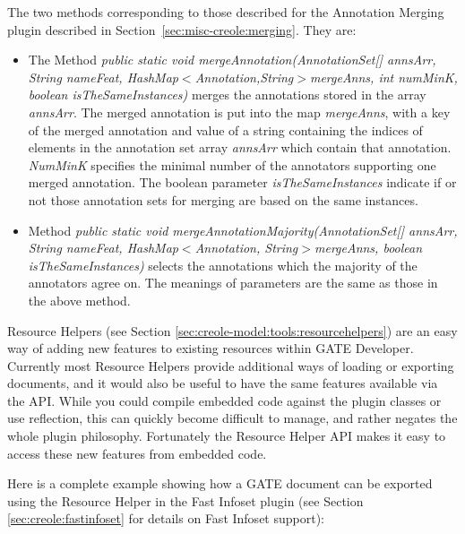 The two methods corresponding to those described for the Annotation Merging
plugin described in Section~\ref{sec:misc-creole:merging}. They are:

\begin{itemize}

\item The Method {\em public static void mergeAnnotation(AnnotationSet[]
    annsArr, String nameFeat, HashMap$<$Annotation,String$>$mergeAnns, int
    numMinK, boolean isTheSameInstances)} merges the annotations stored in the
  array {\em annsArr}. The merged annotation is put into the map {\em
    mergeAnns}, with a key of the merged annotation and value of a string
  containing the indices of elements in the annotation set array {\em annsArr}
  which contain that annotation.  {\em NumMinK} specifies the minimal number
  of the annotators supporting one merged annotation. The boolean parameter
  {\em isTheSameInstances} indicate if or not those annotation sets for
  merging are based on the same instances.

\item Method {\em public static void mergeAnnotationMajority(AnnotationSet[]
    annsArr, String nameFeat, HashMap$<$Annotation, String$>$mergeAnns,
    boolean isTheSameInstances)} selects the annotations which the majority of
  the annotators agree on. The meanings of parameters are the same as those in
  the above method.


\end{itemize}

Resource Helpers (see Section \ref{sec:creole-model:tools:resourcehelpers})
are an easy way of adding new features to existing resources within GATE
Developer. Currently most Resource Helpers provide additional ways of loading
or exporting documents, and it would also be useful to have the same features
available via the API. While you could compile embedded code against the plugin
classes or use reflection, this can quickly become difficult to manage, and
rather negates the whole plugin philosophy. Fortunately the Resource Helper
API makes it easy to access these new features from embedded code.

Here is a complete example showing how a GATE document can be exported using
the Resource Helper in the Fast Infoset plugin (see Section
\ref{sec:creole:fastinfoset} for details on Fast Infoset support):

